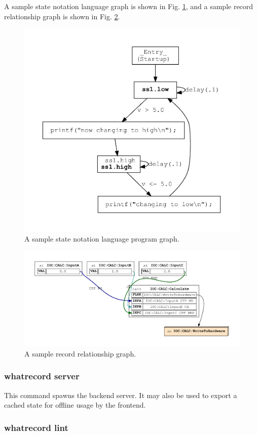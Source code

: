 \documentclass[letter,
               keeplastbox,   %
               ]{jacow}
\begin{document}
A sample state notation language graph is shown in Fig. \ref{fig:simple.st},
and a sample record relationship graph is shown in Fig. \ref{fig:records}.

\begin{figure}
   \centering
   \includegraphics*[width=.7\columnwidth]{st-simple}
   \caption{A sample state notation language program graph.}
   \label{fig:simple.st}
\end{figure}

\begin{figure}
   \centering
   \includegraphics*[width=.9\columnwidth]{calc-records}
   \caption{A sample record relationship graph.}
   \label{fig:records}
\end{figure}

\subsubsection{whatrecord server}

This command spawns the backend server.  It may also be used to export a cached
state for offline usage by the frontend.

\subsubsection{whatrecord lint}
\end{document}

